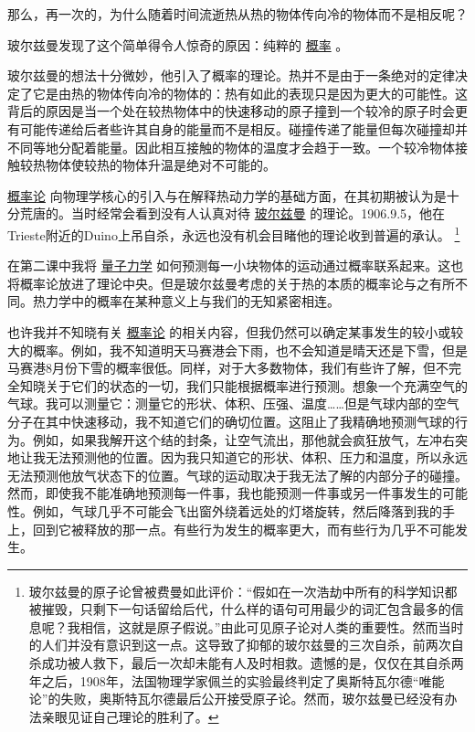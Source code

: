     那么，再一次的，为什么随着时间流逝热从热的物体传向冷的物体而不是相反呢？


    玻尔兹曼发现了这个简单得令人惊奇的原因：纯粹的
\href{http://toyhouse.cc/wiki/index.php/概率}{概率}
。

    玻尔兹曼的想法十分微妙，他引入了概率的理论。热并不是由于一条绝对的定律决定了它是由热的物体传向冷的物体的：热有如此的表现只是因为更大的可能性。这背后的原因是当一个处在较热物体中的快速移动的原子撞到一个较冷的原子时会更有可能传递给后者些许其自身的能量而不是相反。碰撞传递了能量但每次碰撞却并不同等地分配着能量。因此相互接触的物体的温度才会趋于一致。一个较冷物体接触较热物体使较热的物体升温是绝对不可能的。
    

\href{http://toyhouse.cc/wiki/index.php/概率论}{概率论}
向物理学核心的引入与在解释热动力学的基础方面，在其初期被认为是十分荒唐的。当时经常会看到没有人认真对待
\href{http://toyhouse.cc/wiki/index.php/玻尔兹曼}{玻尔兹曼}
的理论。1906.9.5，他在Trieste附近的Duino上吊自杀，永远也没有机会目睹他的理论收到普遍的承认。
\footnote[1]
{
玻尔兹曼的原子论曾被费曼如此评价：“假如在一次浩劫中所有的科学知识都被摧毁，只剩下一句话留给后代，什么样的语句可用最少的词汇包含最多的信息呢？我相信，这就是原子假说。”由此可见原子论对人类的重要性。然而当时的人们并没有意识到这一点。这导致了抑郁的玻尔兹曼的三次自杀，前两次自杀成功被人救下，最后一次却未能有人及时相救。遗憾的是，仅仅在其自杀两年之后，1908年，法国物理学家佩兰的实验最终判定了奥斯特瓦尔德“唯能论”的失败，奥斯特瓦尔德最后公开接受原子论。然而，玻尔兹曼已经没有办法亲眼见证自己理论的胜利了。
}

    在第二课中我将
\href{http://toyhouse.cc/wiki/index.php/量子力学}{量子力学}
如何预测每一小块物体的运动通过概率联系起来。这也将概率论放进了理论中央。但是玻尔兹曼考虑的关于热的本质的概率论与之有所不同。热力学中的概率在某种意义上与我们的无知紧密相连。

    也许我并不知晓有关
\href{http://toyhouse.cc/wiki/index.php/概率论}{概率论}
的相关内容，但我仍然可以确定某事发生的较小或较大的概率。例如，我不知道明天马赛港会下雨，也不会知道是晴天还是下雪，但是马赛港8月份下雪的概率很低。同样，对于大多数物体，我们有些许了解，但不完全知晓关于它们的状态的一切，我们只能根据概率进行预测。想象一个充满空气的气球。我可以测量它：测量它的形状、体积、压强、温度……但是气球内部的空气分子在其中快速移动，我不知道它们的确切位置。这阻止了我精确地预测气球的行为。例如，如果我解开这个结的封条，让空气流出，那他就会疯狂放气，左冲右突地让我无法预测他的位置。因为我只知道它的形状、体积、压力和温度，所以永远无法预测他放气状态下的位置。气球的运动取决于我无法了解的内部分子的碰撞。然而，即使我不能准确地预测每一件事，我也能预测一件事或另一件事发生的可能性。例如，气球几乎不可能会飞出窗外绕着远处的灯塔旋转，然后降落到我的手上，回到它被释放的那一点。有些行为发生的概率更大，而有些行为几乎不可能发生。

